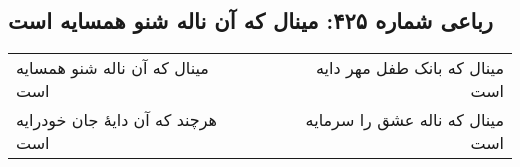 \begin{center}
\section*{رباعی شماره ۴۲۵: مینال که آن ناله شنو همسایه است}
\label{sec:0425}
\begin{longtable}{l p{0.5cm} r}
مینال که آن ناله شنو همسایه است
&&
مینال که بانک طفل مهر دایه است
\\
هرچند که آن دایهٔ جان خودرایه است
&&
مینال که ناله عشق را سرمایه است
\\
\end{longtable}
\end{center}
